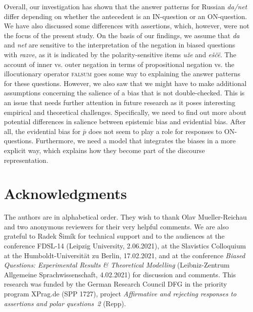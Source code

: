 \documentclass[output=paper,colorlinks,citecolor=brown]{langscibook}
\begin{document}
Overall, our investigation has shown that the answer patterns for Russian \textit{da/net} differ depending on whether the antecedent is an IN-question or an ON-question. We have also discussed some differences with assertions, which, however, were not the focus of the present study. On the basis of our findings, we assume that \textit{da} and \textit{net} are sensitive to the interpretation of the negation in biased questions with \textit{razve}, as it is indicated by the polarity-sensitive items \textit{uže} and \textit{eščë}. The account of inner vs. outer negation in terms of propositional negation vs. the illocutionary operator \textsc{falsum} goes some way to explaining the answer patterns for these questions. However, we also saw that we might have to make additional assumptions concerning the salience of a bias that is not double-checked. This is an issue that needs further attention in future research as it poses interesting empirical and theoretical challenges. Specifically, we need to find out more about potential differences in salience between epistemic bias and evidential bias. After all, the evidential bias for $\bar{p}$ does not seem to play a role for responses to ON-questions. Furthermore, we need a model that integrates the biases in a more explicit way, which explains how they become part of the discourse representation.

\section*{Acknowledgments}

The authors are in alphabetical order. They wish to thank Olav Mueller-Reichau and two anonymous reviewers for their very helpful comments. We are also grateful to Radek Šimík for technical support and to the audiences at the conference FDSL-14 (Leipzig University, 2.06.2021), at the Slavistics Colloquium at the Humboldt-Universität zu Berlin, 17.02.2021, and at the conference \textit{Biased Questions: Experimental Results \& Theoretical Modelling} (Leibniz-Zentrum Allgemeine Sprachwissenschaft, 4.02.2021) for discussion and comments. This research was funded by the German Research Council DFG in the priority program XPrag.de (SPP 1727), project \textit{Affirmative and rejecting responses to assertions and polar questions~2} (Repp).

\printbibliography[heading=subbibliography,notkeyword=this]
\end{document}
